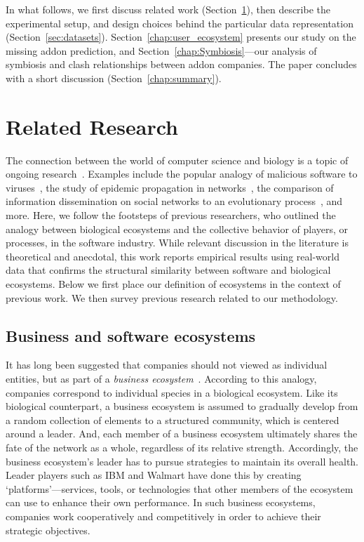 \documentclass[ijoc,nonblindrev]{informs3} %
\numberwithin{equation}{subsection}
\begin{document}
In what follows, we first discuss related work (Section~\ref{sec:related}), then describe the experimental setup, and design choices behind the particular data representation (Section~\ref{sec:datasets}). Section~\ref{chap:user_ecosystem} presents our study on the missing addon prediction, and Section~\ref{chap:Symbiosis}---our analysis of symbiosis and clash relationships between addon companies. The paper concludes with a short discussion (Section~\ref{chap:summary}).

\section{Related Research}
\label{sec:related}

The connection between the world of computer science and biology is a topic of ongoing research~\citep{rasmus2015computational}. Examples include the popular analogy of malicious software to viruses~\citep{cohen1987computer}, the study of epidemic propagation in networks~\citep{christosKAIS14}, the comparison of information dissemination on social networks to an evolutionary process~\citep{adamicWSDM16}, and more. Here, we follow the footsteps of previous researchers, who outlined the analogy between biological ecosystems and the collective behavior of players, or processes, in the software industry. While relevant discussion in the literature is theoretical and anecdotal, this work reports empirical results using real-world data that confirms the structural similarity between software and biological ecosystems. Below we first place our definition of ecosystems in the context of previous work. We then survey previous research related to our methodology.

\subsection{Business and software ecosystems}
\label{sec:bio_ecosystem}

It has long been suggested that companies should not viewed as individual entities, but as part of a {\it business ecosystem}~\citep{moore93,iansiti04}. According to this analogy, companies correspond to individual species in a biological ecosystem. Like its biological counterpart, a business ecosystem is assumed to gradually develop from a random collection of elements to a structured community, which is centered around a leader. And, each member of a business ecosystem ultimately shares the fate of the network as a whole, regardless of its relative strength. Accordingly, the business ecosystem's leader has to pursue strategies to maintain its overall health. Leader players such as IBM and Walmart have done this by creating `platforms'---services, tools, or technologies that other members of the ecosystem can use to enhance their own performance. In such business ecosystems, companies work cooperatively and competitively in order to achieve their strategic objectives. 
\end{document}
